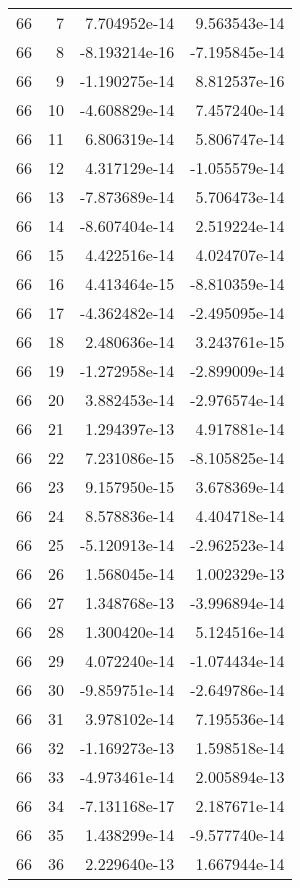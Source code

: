 \begin{tabular}{rrrr}
  66 &    7 &  7.704952e-14 &  9.563543e-14 \\
  66 &    8 & -8.193214e-16 & -7.195845e-14 \\
  66 &    9 & -1.190275e-14 &  8.812537e-16 \\
  66 &   10 & -4.608829e-14 &  7.457240e-14 \\
  66 &   11 &  6.806319e-14 &  5.806747e-14 \\
  66 &   12 &  4.317129e-14 & -1.055579e-14 \\
  66 &   13 & -7.873689e-14 &  5.706473e-14 \\
  66 &   14 & -8.607404e-14 &  2.519224e-14 \\
  66 &   15 &  4.422516e-14 &  4.024707e-14 \\
  66 &   16 &  4.413464e-15 & -8.810359e-14 \\
  66 &   17 & -4.362482e-14 & -2.495095e-14 \\
  66 &   18 &  2.480636e-14 &  3.243761e-15 \\
  66 &   19 & -1.272958e-14 & -2.899009e-14 \\
  66 &   20 &  3.882453e-14 & -2.976574e-14 \\
  66 &   21 &  1.294397e-13 &  4.917881e-14 \\
  66 &   22 &  7.231086e-15 & -8.105825e-14 \\
  66 &   23 &  9.157950e-15 &  3.678369e-14 \\
  66 &   24 &  8.578836e-14 &  4.404718e-14 \\
  66 &   25 & -5.120913e-14 & -2.962523e-14 \\
  66 &   26 &  1.568045e-14 &  1.002329e-13 \\
  66 &   27 &  1.348768e-13 & -3.996894e-14 \\
  66 &   28 &  1.300420e-14 &  5.124516e-14 \\
  66 &   29 &  4.072240e-14 & -1.074434e-14 \\
  66 &   30 & -9.859751e-14 & -2.649786e-14 \\
  66 &   31 &  3.978102e-14 &  7.195536e-14 \\
  66 &   32 & -1.169273e-13 &  1.598518e-14 \\
  66 &   33 & -4.973461e-14 &  2.005894e-13 \\
  66 &   34 & -7.131168e-17 &  2.187671e-14 \\
  66 &   35 &  1.438299e-14 & -9.577740e-14 \\
  66 &   36 &  2.229640e-13 &  1.667944e-14 \\

\end{tabular}

